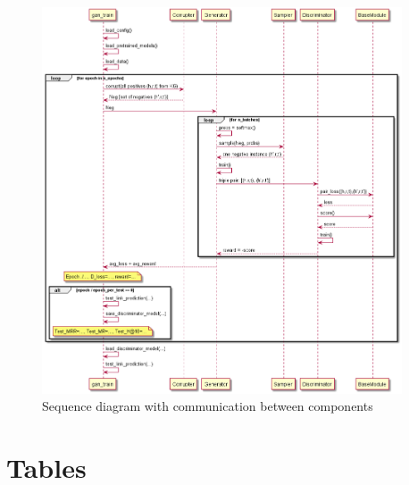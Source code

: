 \begin{figure}[t]
  \centering
    \includegraphics[width=0.95\textwidth]{appendices/gan_train_sequencediagram.png}
  \caption{Sequence diagram with communication between components}
  \label{fig:overview}
\end{figure}
\pagebreak


\chapter{Tables} \label{ch:appendix_tables}
